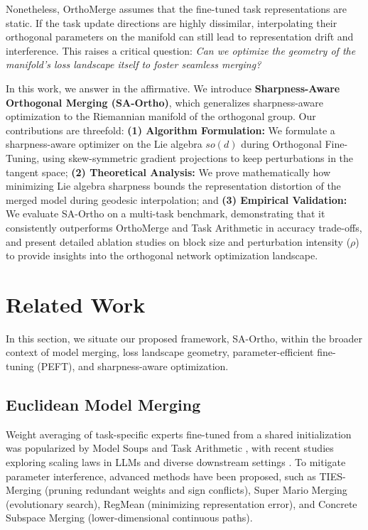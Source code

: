 \documentclass{article}
\theoremstyle{plain}
\theoremstyle{definition}
\theoremstyle{remark}
\begin{document}
Nonetheless, OrthoMerge assumes that the fine-tuned task representations are static. If the task update directions are highly dissimilar, interpolating their orthogonal parameters on the manifold can still lead to representation drift and interference. This raises a critical question: \textit{Can we optimize the geometry of the manifold's loss landscape itself to foster seamless merging?}

In this work, we answer in the affirmative. We introduce \textbf{Sharpness-Aware Orthogonal Merging (SA-Ortho)}, which generalizes sharpness-aware optimization to the Riemannian manifold of the orthogonal group. Our contributions are threefold: \textbf{(1) Algorithm Formulation:} We formulate a sharpness-aware optimizer on the Lie algebra $so(d)$ during Orthogonal Fine-Tuning, using skew-symmetric gradient projections to keep perturbations in the tangent space; \textbf{(2) Theoretical Analysis:} We prove mathematically how minimizing Lie algebra sharpness bounds the representation distortion of the merged model during geodesic interpolation; and \textbf{(3) Empirical Validation:} We evaluate SA-Ortho on a multi-task benchmark, demonstrating that it consistently outperforms OrthoMerge and Task Arithmetic in accuracy trade-offs, and present detailed ablation studies on block size and perturbation intensity ($\rho$) to provide insights into the orthogonal network optimization landscape.

\section{Related Work}
\label{submission-related-work}

In this section, we situate our proposed framework, SA-Ortho, within the broader context of model merging, loss landscape geometry, parameter-efficient fine-tuning (PEFT), and sharpness-aware optimization.

\subsection{Euclidean Model Merging}
Weight averaging of task-specific experts fine-tuned from a shared initialization was popularized by Model Soups \cite{wortsman2022model} and Task Arithmetic \cite{ilharco2022editing}, with recent studies exploring scaling laws in LLMs \cite{wang2025model} and diverse downstream settings \cite{tran2025leveraging}. To mitigate parameter interference, advanced methods have been proposed, such as TIES-Merging \cite{yadav2023ties} (pruning redundant weights and sign conflicts), Super Mario Merging \cite{yu2023language} (evolutionary search), RegMean \cite{nguyen2025regmean} (minimizing representation error), and Concrete Subspace Merging \cite{tang2023concrete} (lower-dimensional continuous paths).
\end{document}
